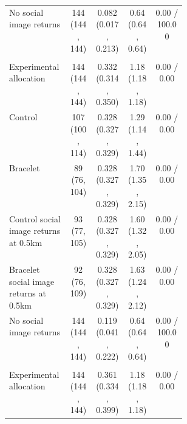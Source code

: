 \begin{longtable}{p{0.34\linewidth}cccc}
No social image returns & \makecell[c]{144\\(144, 144)} & \makecell[c]{0.082\\(0.017, 0.213)} & \makecell[c]{0.64\\(0.64, 0.64)} & 0.00 / 100.00 \\
\addlinespace
\multicolumn{5}{l}{\textit{Correct classification}} \\
Experimental allocation & \makecell[c]{144\\(144, 144)} & \makecell[c]{0.332\\(0.314, 0.350)} & \makecell[c]{1.18\\(1.18, 1.18)} & 0.00 / 0.00 \\
Control & \makecell[c]{107\\(100, 114)} & \makecell[c]{0.328\\(0.327, 0.329)} & \makecell[c]{1.29\\(1.14, 1.44)} & 0.00 / 0.00 \\
Bracelet & \makecell[c]{89\\(76, 104)} & \makecell[c]{0.328\\(0.327, 0.329)} & \makecell[c]{1.70\\(1.35, 2.15)} & 0.00 / 0.00 \\
Control social image returns at 0.5km & \makecell[c]{93\\(77, 105)} & \makecell[c]{0.328\\(0.327, 0.329)} & \makecell[c]{1.60\\(1.32, 2.05)} & 0.00 / 0.00 \\
Bracelet social image returns at 0.5km & \makecell[c]{92\\(76, 109)} & \makecell[c]{0.328\\(0.327, 0.329)} & \makecell[c]{1.63\\(1.24, 2.12)} & 0.00 / 0.00 \\
No social image returns & \makecell[c]{144\\(144, 144)} & \makecell[c]{0.119\\(0.041, 0.222)} & \makecell[c]{0.64\\(0.64, 0.64)} & 0.00 / 100.00 \\
\addlinespace
\multicolumn{5}{l}{\textit{Perceived observability (second order)}} \\
Experimental allocation & \makecell[c]{144\\(144, 144)} & \makecell[c]{0.361\\(0.334, 0.399)} & \makecell[c]{1.18\\(1.18, 1.18)} & 0.00 / 0.00 \\

\end{longtable}
